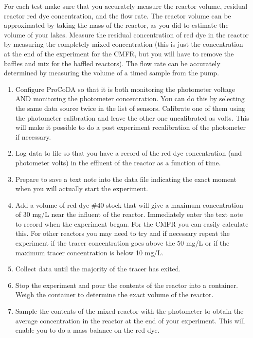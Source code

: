 \documentclass[letterpaper,10pt,english]{sphinxmanual}
\begin{document}
For each test make sure that you accurately measure the reactor volume, residual reactor red dye concentration, and the flow rate. The reactor volume can be approximated by taking the mass of the reactor, as you did to estimate the volume of your lakes.  Measure the residual concentration of red dye in the reactor by measuring the completely mixed concentration (this is just the concentration at the end of the experiment for the CMFR, but you will have to remove the baffles and mix for the baffled reactors). The flow rate can be accurately determined by measuring the volume of a timed sample from the pump.
\begin{enumerate}
\item {} 
Configure ProCoDA so that it is both monitoring the photometer voltage AND monitoring the photometer concentration. You can do this by selecting the same data source twice in the list of sensors. Calibrate one of them using the photometer calibration and leave the other one uncalibrated as volts. This will make it possible to do a post experiment recalibration of the photometer if necessary.

\item {} 
Log data to file so that you have a record of the red dye concentration (and photometer volts) in the effluent of the reactor as a function of time.

\item {} 
Prepare to save a text note into the data file indicating the exact moment when you will actually start the experiment.

\item {} 
Add a volume of red dye \#40 stock that will give a maximum concentration of  30 mg/L near the influent of the reactor. Immediately enter the text note to record when the experiment began. For the CMFR you can easily calculate this. For other reactors you may need to try and if necessary repeat the experiment if the tracer concentration goes above the 50 mg/L or if the maximum tracer concentration is below 10 mg/L.

\item {} 
Collect data until the majority of the tracer has exited.

\item {} 
Stop the experiment and pour the contents of the reactor into a container. Weigh the container to determine the exact volume of the reactor.

\item {} 
Sample the contents of the mixed reactor with the photometer to obtain the average concentration in the reactor at the end of your experiment. This will enable you to do a mass balance on the red dye.

\end{enumerate}
\end{document}

